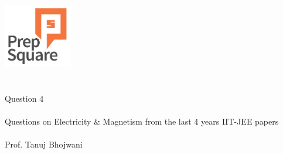 \documentclass{beamer}
\begin{document}
\begin{center}
\ \\ \ \\
\includegraphics[width=30mm]{Logo-final.png} \\
\ \\ \ \\ 
{\huge Question 4 \\ \ \\ }
{\Large
Questions on Electricity \& Magnetism from the last 4 years IIT-JEE papers
}
{\large \ \\ \ \\ Prof. Tanuj Bhojwani }
\end{center}
\end{document}
